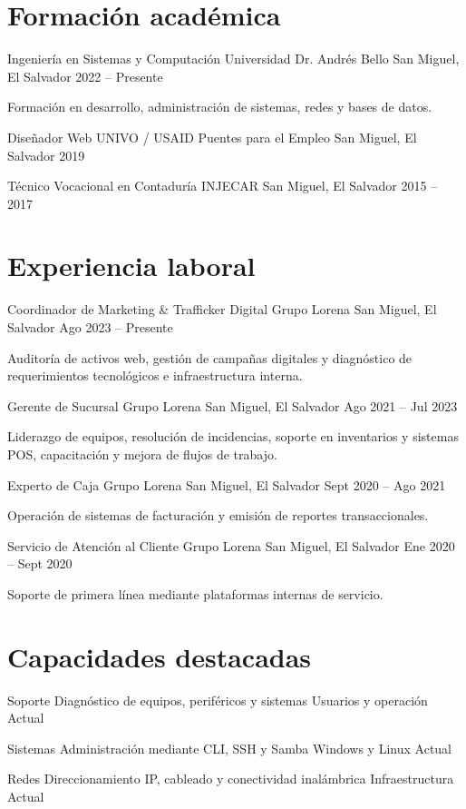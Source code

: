 \documentclass[rightPos]{Mark_VI_Plantilla}
\begin{document}
\makecvheader[L]
\makecvsidebar

\vspace{-\acvSectionTopSkip}
\section{Formación académica}

\cventry
{Ingeniería en Sistemas y Computación}
{Universidad Dr. Andrés Bello}
{San Miguel, El Salvador}
{2022 -- Presente}
{\small Formación en desarrollo, administración de sistemas, redes y bases de datos.\par}

\cventry
{Diseñador Web}
{UNIVO / USAID Puentes para el Empleo}
{San Miguel, El Salvador}
{2019}

\cventry
{Técnico Vocacional en Contaduría}
{INJECAR}
{San Miguel, El Salvador}
{2015 -- 2017}

\section{Experiencia laboral}

\cventry
{Coordinador de Marketing \& Trafficker Digital}
{Grupo Lorena}
{San Miguel, El Salvador}
{Ago 2023 -- Presente}
{\small Auditoría de activos web, gestión de campañas digitales y diagnóstico
de requerimientos tecnológicos e infraestructura interna.\par}

\cventry
{Gerente de Sucursal}
{Grupo Lorena}
{San Miguel, El Salvador}
{Ago 2021 -- Jul 2023}
{\small Liderazgo de equipos, resolución de incidencias, soporte en inventarios
y sistemas POS, capacitación y mejora de flujos de trabajo.\par}

\cventry
{Experto de Caja}
{Grupo Lorena}
{San Miguel, El Salvador}
{Sept 2020 -- Ago 2021}
{\small Operación de sistemas de facturación y emisión de reportes transaccionales.\par}

\cventry
{Servicio de Atención al Cliente}
{Grupo Lorena}
{San Miguel, El Salvador}
{Ene 2020 -- Sept 2020}
{\small Soporte de primera línea mediante plataformas internas de servicio.\par}

\section{Capacidades destacadas}

\begin{cvhonors}
\cvhonor
{Soporte}
{Diagnóstico de equipos, periféricos y sistemas}
{Usuarios y operación}
{Actual}

\cvhonor
{Sistemas}
{Administración mediante CLI, SSH y Samba}
{Windows y Linux}
{Actual}

\cvhonor
{Redes}
{Direccionamiento IP, cableado y conectividad inalámbrica}
{Infraestructura}
{Actual}
\end{cvhonors}

\end{document}

